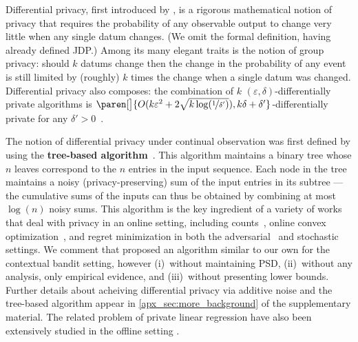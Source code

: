 \documentclass{article}
\DeclarePairedDelimiter{\paren}()
\renewcommand{\paragraph}[1]{\vspace{2pt}\noindent\textbf{#1}}
\begin{document}
Differential privacy, first introduced by
\citet{DworkCalibratingNoiseSensitivity2006,DworkOurData2006}, is a
rigorous mathematical notion of privacy that requires the probability
of any observable output to change very little when any single datum
changes.  (We omit the formal definition, having already defined JDP.)
Among its many elegant traits is the notion of group privacy: should
$k$ datums change then the change in the probability of any event is
still limited by (roughly) $k$ times the change when a single datum
was changed.  Differential privacy also composes: the combination of
$k$ $(\varepsilon,\delta)$-differentially private algorithms is
$\paren[\big]{O(k\varepsilon^2 + 2\sqrt{k\log(\nicefrac 1
    {\delta'})}), k\delta+\delta'}$-differentially private for any
$\delta'>0$~\citep{DworkBoosting2010}.

The notion of differential privacy under continual observation was
first defined by \citet{DworkContinualObservation2010} using the
\textbf{tree-based algorithm}~\citep[originally appearing
in][]{ChanPrivateContinualRelease2010}.  This algorithm maintains a
binary tree whose $n$ leaves correspond to the $n$ entries in the
input sequence. Each node in the tree maintains a noisy
(privacy-preserving) sum of the input entries in its subtree --- the
cumulative sums of the inputs can thus be obtained by combining
at most $\log(n)$ noisy sums.  This algorithm is the key ingredient of
a variety of works that deal with privacy in an online setting,
including counts~\cite{DworkContinualObservation2010}, online convex
optimization~\cite{JainDPOnlineLearning2012}, and regret minimization
in both the
adversarial~\citep{SmithThakurtaPrivateOnlineLearning2013,TossouAchievingPrivacyAdversarial2017}
and
stochastic~\cite{MishraNearlyOptimalDPBandits2015,TossouAlgDPBandits2016}
settings. We comment that \citet{MishraNearlyOptimalDPBandits2015}
proposed an algorithm similar to our own for the contextual bandit
setting, however (i)~without maintaining PSD, (ii)~without any
analysis, only empirical evidence, and (iii)~without presenting lower
bounds. Further details about acheiving differential privacy via
additive noise and the tree-based algorithm appear in
\cref{apx_sec:more_background} of the supplementary material.
%
The related problem of private linear regression have also been extensively studied in the offline setting
\citep{ChaudhuriDPERM2011,BassilyPrivateEmpiricalRisk2014}.
\end{document}
